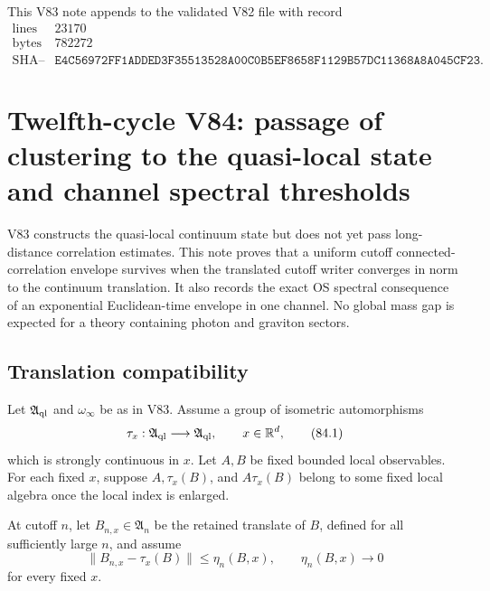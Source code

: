 \documentclass[11pt]{article}
\theoremstyle{remark}
\begin{document}
This V83 note appends to the validated V82 file with record
\[
\begin{array}{c|c}
\text{lines}&23170\\
\text{bytes}&782272\\
\text{SHA--256}&
\texttt{E4C56972FF1ADDED3F35513528A00C0B5EF8658F1129B57DC11368A8A045CF23}.
\end{array}
\]



\section{Twelfth-cycle V84: passage of clustering to the quasi-local
state and channel spectral thresholds}
\label{sec:v12v84}

V83 constructs the quasi-local continuum state but does not yet pass
long-distance correlation estimates.  This note proves that a
uniform cutoff connected-correlation envelope survives when the
translated cutoff writer converges in norm to the continuum
translation.  It also records the exact OS spectral consequence of
an exponential Euclidean-time envelope in one channel.  No global
mass gap is expected for a theory containing photon and graviton
sectors.

\subsection{Translation compatibility}

Let \({\mathfrak A}_{\rm ql}\) and \(\omega_\infty\) be as in V83.
Assume a group of isometric automorphisms
\[
                         \tau_x:{\mathfrak A}_{\rm ql}
                         \longrightarrow{\mathfrak A}_{\rm ql},
 \qquad x\in\mathbb R^d,                                    \tag{84.1}
\]
which is strongly continuous in \(x\).  Let \(A,B\) be fixed bounded
local observables.  For each fixed \(x\), suppose
\(A,\tau_x(B)\), and \(A\tau_x(B)\) belong to some fixed local
algebra once the local index is enlarged.

At cutoff \(n\), let \(B_{n,x}\in{\mathfrak A}_n\) be the retained
translate of \(B\), defined for all sufficiently large \(n\), and
assume
\begin{equation}
                         \|B_{n,x}-\tau_x(B)\|
                         \leq\eta_n(B,x),
 \qquad\eta_n(B,x)\longrightarrow0                          \tag{84.2}
\end{equation}
for every fixed \(x\).
\end{document}
